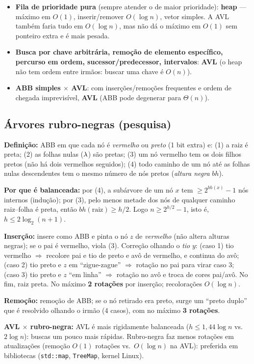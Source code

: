 \begin{prova}
\begin{itemize}
  \item \textbf{Fila de prioridade pura} (sempre atender o de maior prioridade): \textbf{heap} --- máximo em $O(1)$, inserir/remover $O(\log n)$, vetor simples. A AVL também faria tudo em $O(\log n)$, mas não dá o máximo em $O(1)$ sem ponteiro extra e é mais pesada.
  \item \textbf{Busca por chave arbitrária, remoção de elemento específico, percurso em ordem, sucessor/predecessor, intervalos}: \textbf{AVL} (o heap não tem ordem entre irmãos: buscar uma chave é $O(n)$).
  \item \textbf{ABB simples $\times$ AVL}: com inserções/remoções frequentes e ordem de chegada imprevisível, \textbf{AVL} (ABB pode degenerar para $\Theta(n)$).
\end{itemize}
\end{prova}

\subsection{Árvores rubro-negras (pesquisa)}\label{sec:rn}
\begin{complemento}
\textbf{Definição:} ABB em que cada nó é \emph{vermelho} ou \emph{preto} (1 bit extra) e: (1) a raiz é preta; (2) as folhas nulas ($\lambda$) são pretas; (3) um nó vermelho tem os dois filhos pretos (não há dois vermelhos seguidos); (4) todo caminho de um nó até as folhas nulas descendentes tem o mesmo número de nós pretos (\emph{altura negra} $bh$).

\textbf{Por que é balanceada:} por (4), a subárvore de um nó $x$ tem $\ge2^{bh(x)}-1$ nós internos (indução); por (3), pelo menos metade dos nós de qualquer caminho raiz--folha é preta, então $bh(\text{raiz})\ge h/2$. Logo $n\ge2^{h/2}-1$, isto é, $h\le2\log_2(n+1)$.

\textbf{Inserção:} insere como ABB e pinta o nó $z$ de \emph{vermelho} (não altera alturas negras); se o pai é vermelho, viola (3). Correção olhando o \emph{tio} $y$: (caso 1) tio vermelho $\Rightarrow$ recolore pai e tio de preto e avô de vermelho, e continua do avô; (caso 2) tio preto e $z$ em ``zigue-zague'' $\Rightarrow$ rotação no pai para virar caso 3; (caso 3) tio preto e $z$ ``em linha'' $\Rightarrow$ rotação no avô e troca de cores pai/avô. No fim, raiz preta. No máximo \textbf{2 rotações} por inserção; recolorações $O(\log n)$.

\textbf{Remoção:} remoção de ABB; se o nó retirado era preto, surge um ``preto duplo'' que é resolvido olhando o irmão (4 casos), com no máximo \textbf{3 rotações}.

\textbf{AVL $\times$ rubro-negra:} AVL é mais rigidamente balanceada ($h\le1{,}44\log n$ vs.\ $2\log n$): buscas um pouco mais rápidas. Rubro-negra faz menos rotações em atualizações (remoção $O(1)$ rotações vs.\ $O(\log n)$ na AVL): preferida em bibliotecas (\texttt{std::map}, \texttt{TreeMap}, kernel Linux).
\end{complemento}

